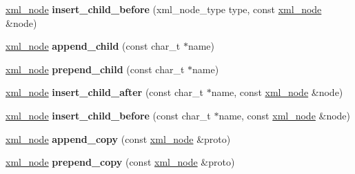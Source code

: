 \begin{DoxyCompactItemize}
\item 
\hypertarget{classpugi_1_1xml__node_afe89f53c01eac8209b06f9fe7f84e7c1}{\hyperlink{classpugi_1_1xml__node}{xml\-\_\-node} {\bfseries insert\-\_\-child\-\_\-before} (xml\-\_\-node\-\_\-type type, const \hyperlink{classpugi_1_1xml__node}{xml\-\_\-node} \&node)}\label{classpugi_1_1xml__node_afe89f53c01eac8209b06f9fe7f84e7c1}

\item 
\hypertarget{classpugi_1_1xml__node_a448342425806a4ad8068bf98fd4ff462}{\hyperlink{classpugi_1_1xml__node}{xml\-\_\-node} {\bfseries append\-\_\-child} (const char\-\_\-t $\ast$name)}\label{classpugi_1_1xml__node_a448342425806a4ad8068bf98fd4ff462}

\item 
\hypertarget{classpugi_1_1xml__node_afa78286431f99a0f35b18185e11e28e8}{\hyperlink{classpugi_1_1xml__node}{xml\-\_\-node} {\bfseries prepend\-\_\-child} (const char\-\_\-t $\ast$name)}\label{classpugi_1_1xml__node_afa78286431f99a0f35b18185e11e28e8}

\item 
\hypertarget{classpugi_1_1xml__node_a778c2246fef9964b2d947253a86f2982}{\hyperlink{classpugi_1_1xml__node}{xml\-\_\-node} {\bfseries insert\-\_\-child\-\_\-after} (const char\-\_\-t $\ast$name, const \hyperlink{classpugi_1_1xml__node}{xml\-\_\-node} \&node)}\label{classpugi_1_1xml__node_a778c2246fef9964b2d947253a86f2982}

\item 
\hypertarget{classpugi_1_1xml__node_a70fa68762aed11c82a1b913571df4394}{\hyperlink{classpugi_1_1xml__node}{xml\-\_\-node} {\bfseries insert\-\_\-child\-\_\-before} (const char\-\_\-t $\ast$name, const \hyperlink{classpugi_1_1xml__node}{xml\-\_\-node} \&node)}\label{classpugi_1_1xml__node_a70fa68762aed11c82a1b913571df4394}

\item 
\hypertarget{classpugi_1_1xml__node_a17971e2b69c4dd4f45c461ebffe96732}{\hyperlink{classpugi_1_1xml__node}{xml\-\_\-node} {\bfseries append\-\_\-copy} (const \hyperlink{classpugi_1_1xml__node}{xml\-\_\-node} \&proto)}\label{classpugi_1_1xml__node_a17971e2b69c4dd4f45c461ebffe96732}

\item 
\hypertarget{classpugi_1_1xml__node_a29cc787ee2270e3a71e1d511164621e6}{\hyperlink{classpugi_1_1xml__node}{xml\-\_\-node} {\bfseries prepend\-\_\-copy} (const \hyperlink{classpugi_1_1xml__node}{xml\-\_\-node} \&proto)}\label{classpugi_1_1xml__node_a29cc787ee2270e3a71e1d511164621e6}


\end{DoxyCompactItemize}
